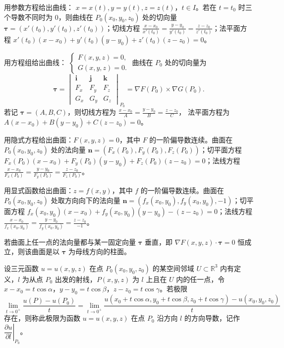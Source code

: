 

 用参数方程给出曲线：
$x=x(t),y=y(t),z=z(t)$，$t\in I$。若在 $t=t_0$ 时三个导数不同时为 $0$，则曲线在 $P_0(x_0,y_0,z_0)$ 处的切向量
$\bm\tau=(x'(t_0),y'(t_0),z'(t_0))$；切线方程
$\displaystyle \frac{x-x_0}{x'(t_0)}
=\frac{y-y_0}{y'(t_0)}
=\frac{z-z_0}{z'(t_0)}$；法平面方程
$x'(t_0)(x-x_0)+y'(t_0)(y-y_0)+z'(t_0)(z-z_0)=0$。

 用方程组给出曲线：
$\displaystyle \begin{cases}F(x,y,z)=0,\\G(x,y,z)=0.\end{cases}$
曲线在 $P_0$ 处的切向量为
\[
\bm\tau=
\begin{vmatrix}
\bm i&\bm j&\bm k\\
F_x&F_y&F_z\\
G_x&G_y&G_z
\end{vmatrix}_{P_0}
=\nabla F(P_0)\times\nabla G(P_0).
\]
若记 $\bm\tau=(A,B,C)$，则切线方程为
$\displaystyle \frac{x-x_0}{A}=\frac{y-y_0}{B}=\frac{z-z_0}{C}$，
法平面方程为 $A(x-x_0)+B(y-y_0)+C(z-z_0)=0$。


 用隐式方程给出曲面：$F(x,y,z)=0$，其中 $F$ 的一阶偏导数连续。曲面在 $P_0(x_0,y_0,z_0)$ 处的法向量
$\bm n=(F_x(P_0),F_y(P_0),F_z(P_0))$；切平面方程
$F_x(P_0)(x-x_0)+F_y(P_0)(y-y_0)+F_z(P_0)(z-z_0)=0$；法线方程
$\displaystyle \frac{x-x_0}{F_x(P_0)}
=\frac{y-y_0}{F_y(P_0)}
=\frac{z-z_0}{F_z(P_0)}$。

 用显式函数给出曲面：$z=f(x,y)$，其中 $f$ 的一阶偏导数连续。曲面在 $P_0(x_0,y_0,z_0)$ 处取方向向下的法向量
$\bm n=(f_x(x_0,y_0),f_y(x_0,y_0),-1)$；切平面方程
$f_x(x_0,y_0)(x-x_0)+f_y(x_0,y_0)(y-y_0)-(z-z_0)=0$；法线方程
$\displaystyle \frac{x-x_0}{f_x(x_0,y_0)}
=\frac{y-y_0}{f_y(x_0,y_0)}
=\frac{z-z_0}{-1}$。

\begin{notebox}
若曲面上任一点的法向量都与某一固定向量 $\bm\tau$ 垂直，即 $\nabla F(x,y,z)\cdot\bm\tau=0$ 恒成立，则该曲面是以 $\bm\tau$ 为母线方向的柱面。
\end{notebox}



\quad 设三元函数 $u=u(x,y,z)$ 在点 $P_0(x_0,y_0,z_0)$ 的某空间邻域 $U\subset\mathbb R^3$ 内有定义，$l$ 为从点 $P_0$ 出发的射线，$P(x,y,z)$ 为 $l$ 上且在 $U$ 内的任一点，令
$x-x_0=t\cos\alpha$，$y-y_0=t\cos\beta$，$z-z_0=t\cos\gamma$。若极限
\[
\lim_{t\to0^+}\frac{u(P)-u(P_0)}{t}
=\lim_{t\to0^+}
\frac{u(x_0+t\cos\alpha,y_0+t\cos\beta,z_0+t\cos\gamma)-u(x_0,y_0,z_0)}{t}
\]
存在，则称此极限为函数 $u=u(x,y,z)$ 在点 $P_0$ 沿方向 $l$ 的方向导数，记作
$\left.\dfrac{\partial u}{\partial l}\right|_{P_0}$。

